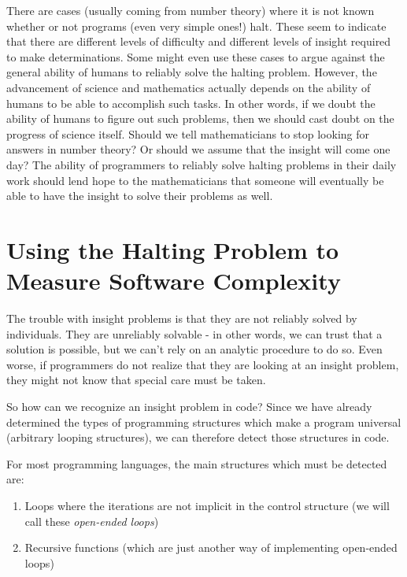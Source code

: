 There are cases (usually coming from number theory) where it is not known whether or not programs (even very simple ones!)  halt.  These seem to indicate that there are different levels of difficulty and different levels of insight required to make determinations.  Some might even use these cases to argue against the general ability of humans to reliably solve the halting problem.  However, the advancement of science and mathematics actually depends on the ability of humans to be able to accomplish such tasks.  In other words, if we doubt the ability of humans to figure out such problems, then we should cast doubt on the progress of science itself.  Should we tell mathematicians to stop looking for answers in number theory?   Or should we assume that the insight will come one day?  The ability of programmers to reliably solve halting problems in their daily work should lend hope to the mathematicians that someone will eventually be able to have the insight to solve their problems as well.

\section{Using the Halting Problem to Measure Software Complexity}

The trouble with insight problems is that they are not reliably solved by individuals.  They are unreliably solvable - in other words, we can trust that a solution is possible, but we can't rely on an analytic procedure to do so.  Even worse, if programmers do not realize that they are looking at an insight problem, they might not know that special care must be taken.

So how can we recognize an insight problem in code?  Since we have already determined the types of programming structures which make a program universal (arbitrary looping structures), we can therefore detect those structures in code.

For most programming languages, the main structures which must be detected are:

\begin{enumerate}
\item Loops where the iterations are not implicit in the control structure (we will call these \emph{open-ended loops})
\item Recursive functions (which are just another way of implementing open-ended loops)
\end{enumerate}

